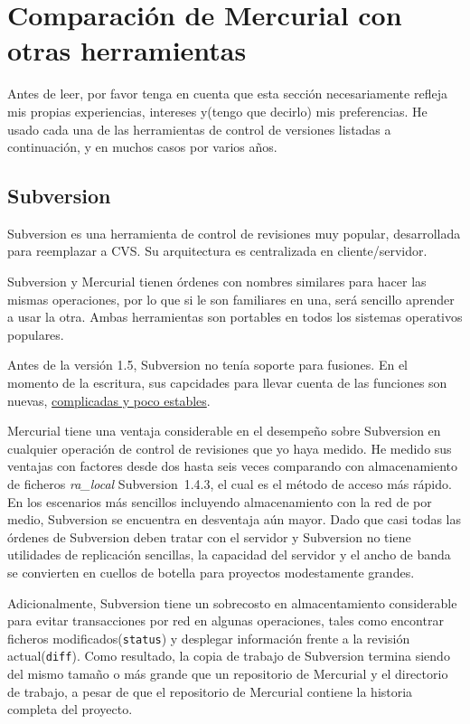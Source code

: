 \section{Comparación de Mercurial con otras herramientas}

Antes de leer, por favor tenga en cuenta que esta sección
necesariamente refleja mis propias experiencias, intereses y(tengo que
decirlo) mis preferencias. He usado cada una de las herramientas de
control de versiones listadas a continuación, y en muchos casos por
varios años.


\subsection{Subversion}

Subversion es una herramienta de control de revisiones muy popular,
desarrollada para reemplazar a CVS.  Su arquitectura es centralizada
en cliente/servidor.

Subversion y Mercurial tienen órdenes con nombres similares para hacer
las mismas operaciones, por lo que si le son familiares en una, será
sencillo aprender a usar la otra. Ambas herramientas son portables en
todos los sistemas operativos populares.

Antes de la versión 1.5, Subversion no tenía soporte para fusiones. En
el momento de la escritura, sus capcidades para llevar cuenta de las
funciones son nuevas,
\href{http://svnbook.red-bean.com/nightly/en/svn.branchmerge.advanced.html#svn.branchmerge.advanced.finalword}{complicadas
  y poco estables}.

Mercurial tiene una ventaja considerable en el desempeño sobre
Subversion en cualquier operación de control de revisiones que yo haya
medido. He medido sus ventajas con factores desde dos hasta seis veces
comparando con almacenamiento de ficheros \emph{ra\_local}
Subversion~1.4.3, el cual es el método de acceso más rápido.  En los
escenarios más sencillos incluyendo almacenamiento con la red de por
medio, Subversion se encuentra en desventaja aún mayor. Dado que casi
todas las órdenes de Subversion deben tratar con el servidor y
Subversion no tiene utilidades de replicación sencillas, la capacidad
del servidor y el ancho de banda se convierten en cuellos de botella
para proyectos modestamente grandes.

Adicionalmente, Subversion tiene un sobrecosto en almacentamiento
considerable para evitar transacciones por red en algunas operaciones,
tales como encontrar ficheros modificados(\texttt{status}) y desplegar
información frente a la revisión actual(\texttt{diff}).  Como
resultado, la copia de trabajo de Subversion termina siendo del mismo
tamaño o más grande que un repositorio de Mercurial y el directorio de
trabajo, a pesar de que el repositorio de Mercurial contiene la
historia completa  del proyecto.


